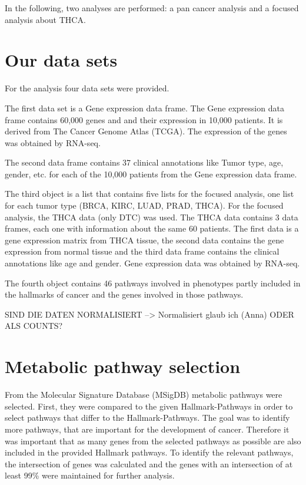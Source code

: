 \documentclass[
  parskip,
  oneside]{scrreprt}
\begin{document}
In the following, two analyses are performed: a pan cancer analysis and
a focused analysis about THCA.

\hypertarget{our-data-sets}{%
\section{Our data sets}\label{our-data-sets}}

For the analysis four data sets were provided.

The first data set is a Gene expression data frame. The Gene expression
data frame contains 60,000 genes and and their expression in 10,000
patients. It is derived from The Cancer Genome Atlas (TCGA). The
expression of the genes was obtained by RNA-seq.

The second data frame contains 37 clinical annotations like Tumor type,
age, gender, etc. for each of the 10,000 patients from the Gene
expression data frame.

The third object is a list that contains five lists for the focused
analysis, one list for each tumor type (BRCA, KIRC, LUAD, PRAD, THCA).
For the focused analysis, the THCA data (only DTC) was used. The THCA
data contains 3 data frames, each one with information about the same 60
patients. The first data is a gene expression matrix from THCA tissue,
the second data contains the gene expression from normal tissue and the
third data frame contains the clinical annotations like age and gender.
Gene expression data was obtained by RNA-seq.

The fourth object contains 46 pathways involved in phenotypes partly
included in the hallmarks of cancer and the genes involved in those
pathways.

SIND DIE DATEN NORMALISIERT --\textgreater{} Normalisiert glaub ich
(Anna) ODER ALS COUNTS?

\hypertarget{metabolic-pathway-selection}{%
\section{Metabolic pathway
selection}\label{metabolic-pathway-selection}}

From the Molecular Signature Database (MSigDB) \cite{xxx} metabolic
pathways were selected. First, they were compared to the given
Hallmark-Pathways in order to select pathways that differ to the
Hallmark-Pathways. The goal was to identify more pathways, that are
important for the development of cancer. Therefore it was important that
as many genes from the selected pathways as possible are also included
in the provided Hallmark pathways. To identify the relevant pathways,
the intersection of genes was calculated and the genes with an
intersection of at least 99\% were maintained for further analysis.
\end{document}
